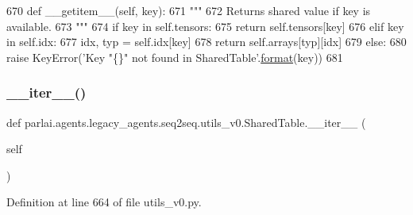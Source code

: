\begin{DoxyCode}
670     \textcolor{keyword}{def }\_\_getitem\_\_(self, key):
671         \textcolor{stringliteral}{"""}
672 \textcolor{stringliteral}{        Returns shared value if key is available.}
673 \textcolor{stringliteral}{        """}
674         \textcolor{keywordflow}{if} key \textcolor{keywordflow}{in} self.tensors:
675             \textcolor{keywordflow}{return} self.tensors[key]
676         \textcolor{keywordflow}{elif} key \textcolor{keywordflow}{in} self.idx:
677             idx, typ = self.idx[key]
678             \textcolor{keywordflow}{return} self.arrays[typ][idx]
679         \textcolor{keywordflow}{else}:
680             \textcolor{keywordflow}{raise} KeyError(\textcolor{stringliteral}{'Key "\{\}" not found in SharedTable'}.\hyperlink{namespaceparlai_1_1chat__service_1_1services_1_1messenger_1_1shared__utils_a32e2e2022b824fbaf80c747160b52a76}{format}(key))
681 
\end{DoxyCode}
\mbox{\label{classparlai_1_1agents_1_1legacy__agents_1_1seq2seq_1_1utils__v0_1_1SharedTable_a8856d56b13e4d45bc4b6c0097a2579e1}} 
\subsubsection{\texorpdfstring{\+\_\+\+\_\+iter\+\_\+\+\_\+()}{\_\_iter\_\_()}}
{\footnotesize\ttfamily def parlai.\+agents.\+legacy\+\_\+agents.\+seq2seq.\+utils\+\_\+v0.\+Shared\+Table.\+\_\+\+\_\+iter\+\_\+\+\_\+ (\begin{DoxyParamCaption}\item[{}]{self }\end{DoxyParamCaption})}



Definition at line 664 of file utils\+\_\+v0.\+py.


